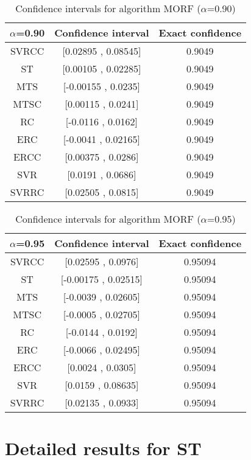 \documentclass[a4paper,10pt]{article}
\begin{document}
\begin{table}[!htp]
\centering\small
\begin{tabular}{
|c|c|c|}
\hline
 $\alpha$=0.90 & Confidence interval & Exact confidence \\ \hline 
SVRCC & [0.02895 , 0.08545] & 0.9049\\ \hline 
ST & [0.00105 , 0.02285] & 0.9049\\ \hline 
MTS & [-0.00155 , 0.0235] & 0.9049\\ \hline 
MTSC & [0.00115 , 0.0241] & 0.9049\\ \hline 
RC & [-0.0116 , 0.0162] & 0.9049\\ \hline 
ERC & [-0.0041 , 0.02165] & 0.9049\\ \hline 
ERCC & [0.00375 , 0.0286] & 0.9049\\ \hline 
SVR & [0.0191 , 0.0686] & 0.9049\\ \hline 
SVRRC & [0.02505 , 0.0815] & 0.9049\\ \hline 

\end{tabular}
\caption{Confidence intervals for algorithm MORF ($\alpha$=0.90)}
\end{table}
\begin{table}[!htp]
\centering\small
\begin{tabular}{
|c|c|c|}
\hline
 $\alpha$=0.95 & Confidence interval & Exact confidence \\ \hline 
SVRCC & [0.02595 , 0.0976] & 0.95094\\ \hline 
ST & [-0.00175 , 0.02515] & 0.95094\\ \hline 
MTS & [-0.0039 , 0.02605] & 0.95094\\ \hline 
MTSC & [-0.0005 , 0.02705] & 0.95094\\ \hline 
RC & [-0.0144 , 0.0192] & 0.95094\\ \hline 
ERC & [-0.0066 , 0.02495] & 0.95094\\ \hline 
ERCC & [0.0024 , 0.0305] & 0.95094\\ \hline 
SVR & [0.0159 , 0.08635] & 0.95094\\ \hline 
SVRRC & [0.02135 , 0.0933] & 0.95094\\ \hline 

\end{tabular}
\caption{Confidence intervals for algorithm MORF ($\alpha$=0.95)}
\end{table}

 \clearpage 


\section{Detailed results for ST}
\end{document}
